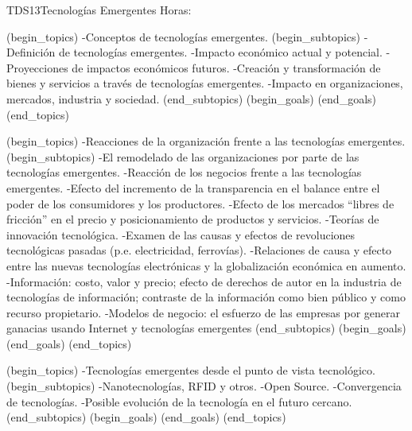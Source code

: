 \begin{BKL2}{TDS13}{Tecnologías Emergentes}
Horas:
 
(begin_topics)
-Conceptos de tecnologías emergentes.
(begin_subtopics)
-Definición de tecnologías emergentes.
-Impacto económico actual y potencial.
-Proyecciones de impactos económicos futuros.
-Creación y transformación de bienes y servicios a través de tecnologías emergentes.
-Impacto en organizaciones, mercados, industria y sociedad.
(end_subtopics)
(begin_goals)
(end_goals)
(end_topics)

(begin_topics)
-Reacciones de la organización frente a las tecnologías emergentes.
(begin_subtopics)
-El remodelado de las organizaciones por parte de las tecnologías emergentes.
-Reacción de los negocios frente a las tecnologías emergentes.
-Efecto del incremento de la transparencia en el balance entre el poder de los consumidores y los productores.
-Efecto de los mercados ``libres de fricción'' en el precio y posicionamiento de productos y servicios.
-Teorías de innovación tecnológica.
-Examen de las causas y efectos de revoluciones tecnológicas pasadas (p.e. electricidad, ferrovías).
-Relaciones de causa y efecto entre las nuevas tecnologías electrónicas y la globalización económica en aumento.
-Información: costo, valor y precio; efecto de derechos de autor en la industria de tecnologías de información; contraste de la información como bien público y como recurso propietario.
-Modelos de negocio: el esfuerzo de las empresas por generar ganacias usando Internet y tecnologías emergentes 
(end_subtopics)
(begin_goals)
(end_goals)
(end_topics)

(begin_topics)
-Tecnologías emergentes desde el punto de vista tecnológico.
(begin_subtopics)
-Nanotecnologías, RFID y otros.
-Open Source.
-Convergencia de tecnologías.
-Posible evolución de la tecnología en el futuro cercano.
(end_subtopics)
(begin_goals)
(end_goals)
(end_topics)

\end{BKL2}

